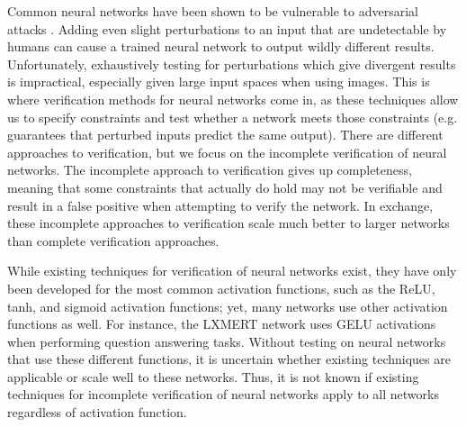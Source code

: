 \documentclass{llncs}
\begin{document}
Common neural networks have been shown to be vulnerable to adversarial attacks \cite{szegedy2013intriguing,goodfellow2014explaining,kurakin2016adversarial,carlini2017towards,athalye2018synthesizing,eykholt2018robust,papernot2017practical,papernot2016transferability}.
Adding even slight perturbations to an input that are undetectable by humans can cause a trained neural network to output wildly different results.
Unfortunately, exhaustively testing for perturbations which give divergent results is impractical, especially given large input spaces when using images.
This is where verification methods for neural networks come in, as these techniques allow us to specify constraints and test whether a network meets those constraints (e.g. guarantees that perturbed inputs predict the same output).
There are different approaches to verification, but we focus on the incomplete verification of neural networks.
The incomplete approach to verification gives up completeness, meaning that some constraints that actually do hold may not be verifiable and result in a false positive when attempting to verify the network.
In exchange, these incomplete approaches to verification scale much better to larger networks than complete verification approaches.

While existing techniques for verification of neural networks exist, they have only been developed for the most common activation functions, such as the ReLU, tanh, and sigmoid activation functions; yet, many networks use other activation functions as well.
For instance, the LXMERT network \cite{LXMERT} uses GELU activations when performing question answering tasks.
Without testing on neural networks that use these different functions, it is uncertain whether existing techniques are applicable or scale well to these networks.
Thus, it is not known if existing techniques for incomplete verification of neural networks apply to all networks regardless of activation function.
\end{document}

